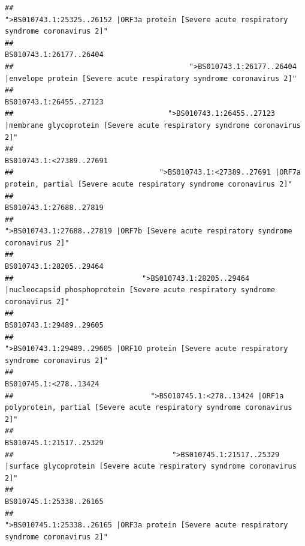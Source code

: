 \documentclass[
]{article}
\begin{document}
\begin{verbatim}
##                                            ">BS010743.1:25325..26152 |ORF3a protein [Severe acute respiratory syndrome coronavirus 2]" 
##                                                                                                                BS010743.1:26177..26404 
##                                         ">BS010743.1:26177..26404 |envelope protein [Severe acute respiratory syndrome coronavirus 2]" 
##                                                                                                                BS010743.1:26455..27123 
##                                    ">BS010743.1:26455..27123 |membrane glycoprotein [Severe acute respiratory syndrome coronavirus 2]" 
##                                                                                                               BS010743.1:<27389..27691 
##                                  ">BS010743.1:<27389..27691 |ORF7a protein, partial [Severe acute respiratory syndrome coronavirus 2]" 
##                                                                                                                BS010743.1:27688..27819 
##                                                    ">BS010743.1:27688..27819 |ORF7b [Severe acute respiratory syndrome coronavirus 2]" 
##                                                                                                                BS010743.1:28205..29464 
##                              ">BS010743.1:28205..29464 |nucleocapsid phosphoprotein [Severe acute respiratory syndrome coronavirus 2]" 
##                                                                                                                BS010743.1:29489..29605 
##                                            ">BS010743.1:29489..29605 |ORF10 protein [Severe acute respiratory syndrome coronavirus 2]" 
##                                                                                                                 BS010745.1:<278..13424 
##                                ">BS010745.1:<278..13424 |ORF1a polyprotein, partial [Severe acute respiratory syndrome coronavirus 2]" 
##                                                                                                                BS010745.1:21517..25329 
##                                     ">BS010745.1:21517..25329 |surface glycoprotein [Severe acute respiratory syndrome coronavirus 2]" 
##                                                                                                                BS010745.1:25338..26165 
##                                            ">BS010745.1:25338..26165 |ORF3a protein [Severe acute respiratory syndrome coronavirus 2]" 

\end{verbatim}
\end{document}
